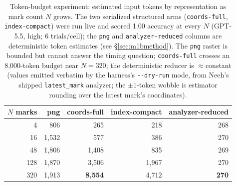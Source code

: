 \documentclass[11pt]{article}
\newcommand{\code}[1]{\texttt{#1}}
\begin{document}
\begin{table}[t]
\centering
\small
\begin{tabular}{@{}r rrrr@{}}
\toprule
\textbf{$N$ marks} & \textbf{png} & \textbf{coords-full} & \textbf{index-compact} & \textbf{analyzer-reduced} \\
\midrule
4   & 806   & 265   & 218   & 268 \\
16  & 1{,}532 & 577   & 386   & 270 \\
48  & 1{,}806 & 1{,}408 & 835   & 269 \\
128 & 1{,}870 & 3{,}506 & 1{,}967 & 270 \\
320 & 1{,}913 & \textbf{8{,}554} & 4{,}712 & \textbf{270} \\
\bottomrule
\end{tabular}
\caption{Token-budget experiment: estimated input tokens by representation as
mark count $N$ grows. The two serialized structured arms (\code{coords-full},
\code{index-compact}) were run live and scored 1.00 accuracy at every $N$
(GPT-5.5, high; 6 trials/cell); the \code{png} and \code{analyzer-reduced}
columns are deterministic token estimates (see \S\ref{sec:m1bmethod}). The
\code{png} raster is bounded but cannot answer the timing question;
\code{coords-full} crosses an 8{,}000-token budget near $N{=}320$; the
deterministic reducer is $\approx$constant (values emitted verbatim by the
harness's \code{-{}-dry-run} mode, from Neeh's shipped \code{latest\_mark}
analyzer; the $\pm1$-token wobble is estimator rounding over the latest mark's
coordinates).}
\label{tab:move1b}
\end{table}
\end{document}
